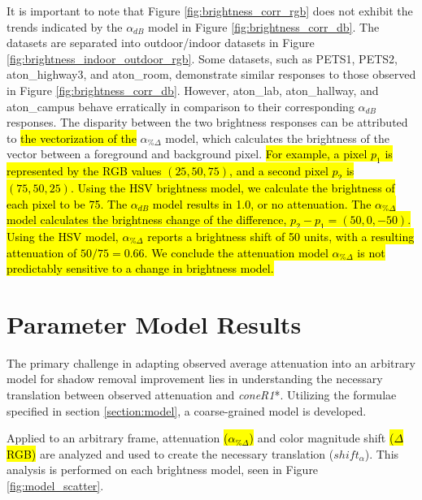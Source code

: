 \documentclass[12pt]{report}
\begin{document}
It is important to note that Figure \ref{fig:brightness_corr_rgb} does not exhibit the trends indicated by the $\alpha_{dB}$ model in Figure \ref{fig:brightness_corr_db}. The datasets are separated into outdoor/indoor datasets in Figure \ref{fig:brightness_indoor_outdoor_rgb}. Some datasets, such as PETS1, PETS2, aton\_highway3, and aton\_room, demonstrate similar responses to those observed in Figure \ref{fig:brightness_corr_db}. However, aton\_lab, aton\_hallway, and aton\_campus behave erratically in comparison to their corresponding $\alpha_{dB}$ responses. The disparity between the two brightness responses can be attributed to \hl{the vectorization of the} $\alpha_{\%\Delta}$ model, which calculates the brightness of the vector between a foreground and background pixel. \hl{For example, a pixel $p_{1}$ is represented by the RGB values $(25, 50, 75)$, and a second pixel $p_{2}$ is $(75, 50, 25)$. Using the HSV brightness model, we calculate the brightness of each pixel to be 75. The $\alpha_{dB}$ model results in 1.0, or no attenuation. The $\alpha_{\%\Delta}$ model calculates the brightness change of the difference, $p_{2} - p_{1} = (50, 0, -50)$. Using the HSV model, $\alpha_{\%\Delta}$ reports a brightness shift of 50 units, with a resulting attenuation of $50 / 75 = 0.66$. We conclude the attenuation model $\alpha_{\%\Delta}$ is not predictably sensitive to a change in brightness model.}

\section{Parameter Model Results}

The primary challenge in adapting observed average attenuation into an arbitrary model for shadow removal improvement lies in understanding the necessary translation between observed attenuation and \textit{coneR1}*. Utilizing the formulae specified in section \ref{section:model}, a coarse-grained model is developed. 

Applied to an arbitrary frame, attenuation \hl{($\alpha_{\%\Delta}$)} and color magnitude shift \hl{($\Delta$RGB)} are analyzed and used to create the necessary translation ($shift_{\alpha}$). This analysis is performed on each brightness model, seen in Figure \ref{fig:model_scatter}. 
\end{document}
